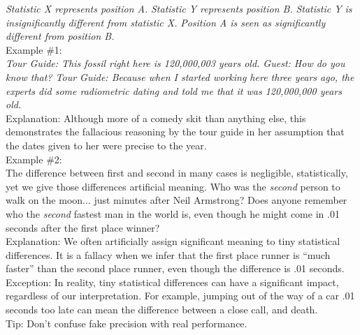 \documentclass[a4paper,12pt,single,pdftex]{scrartcl}
\begin{document}
    
      {\em Statistic X represents position A.} \newline
{\em Statistic Y represents position B.} \newline
{\em Statistic Y is insignificantly different from statistic X.} \newline
{\em Position A is seen as significantly different from position B.}
    \\

    
      Example \#1:
    \\

    
      {\em Tour Guide: This fossil right here is 120,000,003 years old. \newline
Guest: How do you know that? \newline
Tour Guide: Because when I started working here three years ago, the experts did some radiometric dating and told me that it was 120,000,000 years old.}
    \\

    
      Explanation: Although more of a comedy skit than anything else, this demonstrates the fallacious reasoning by the tour guide in her assumption that the dates given to her were precise to the year.
    \\

    
      Example \#2: 
    \\

    
      The difference between first and second in many cases is negligible, statistically, yet we give those differences artificial meaning.  Who was the {\it second} person to walk on the moon... just minutes after Neil Armstrong?  Does anyone remember who the {\it second}  fastest man in the world is, even though he might come in .01 seconds after the first place winner?
    \\

    
      Explanation:  We often artificially assign significant meaning to tiny statistical differences.  It is a fallacy when we infer that the first place runner is “much faster” than the second place runner, even though the difference is .01 seconds.
    \\

    
      Exception: In reality, tiny statistical differences can have a significant impact, regardless of our interpretation.  For example, jumping out of the way of a car .01 seconds too late can mean the difference between a close call, and death.
    \\

    
      Tip: Don’t confuse fake precision with real performance.
    \\
\end{document}
